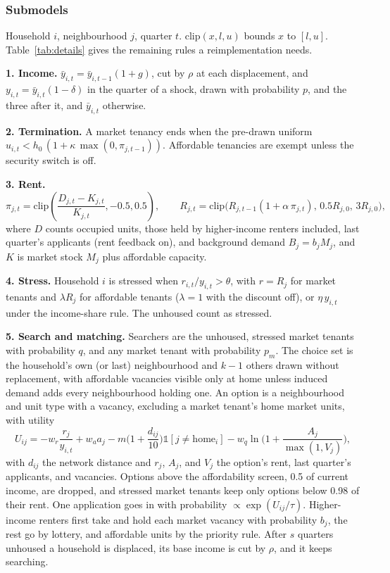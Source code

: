 \documentclass[10pt,a4paper]{article}
\begin{document}
\subsubsection*{Submodels}

Household $i$, neighbourhood $j$, quarter $t$. $\mathrm{clip}(x,l,u)$ bounds $x$ to $[l,u]$. Table~\ref{tab:details} gives the remaining rules a reimplementation needs.

\textbf{1. Income.} $\bar y_{i,t}=\bar y_{i,t-1}(1+g)$, cut by $\rho$ at each displacement, and $y_{i,t}=\bar y_{i,t}(1-\delta)$ in the quarter of a shock, drawn with probability $p$, and the three after it, and $\bar y_{i,t}$ otherwise.

\textbf{2. Termination.} A market tenancy ends when the pre-drawn uniform $u_{i,t}<h_0\,(1+\kappa\,\max(0,\pi_{j,t-1}))$. Affordable tenancies are exempt unless the security switch is off.

\textbf{3. Rent.}
\begin{equation}
\pi_{j,t}=\mathrm{clip}\!\left(\frac{D_{j,t}-K_{j,t}}{K_{j,t}},-0.5,0.5\right),\qquad
R_{j,t}=\mathrm{clip}\!\big(R_{j,t-1}(1+\alpha\,\pi_{j,t}),\,0.5R_{j,0},\,3R_{j,0}\big),
\end{equation}
where $D$ counts occupied units, those held by higher-income renters included, last quarter's applicants (rent feedback on), and background demand $B_j=b_jM_j$, and $K$ is market stock $M_j$ plus affordable capacity.

\textbf{4. Stress.} Household $i$ is stressed when $r_{i,t}/y_{i,t}>\theta$, with $r=R_j$ for market tenants and $\lambda R_j$ for affordable tenants ($\lambda=1$ with the discount off), or $\eta\,y_{i,t}$ under the income-share rule. The unhoused count as stressed.

\textbf{5. Search and matching.} Searchers are the unhoused, stressed market tenants with probability $q$, and any market tenant with probability $p_m$. The choice set is the household's own (or last) neighbourhood and $k-1$ others drawn without replacement, with affordable vacancies visible only at home unless induced demand adds every neighbourhood holding one. An option is a neighbourhood and unit type with a vacancy, excluding a market tenant's home market units, with utility
\begin{equation}
U_{ij}=-w_r\frac{r_j}{y_{i,t}}+w_a a_j-m\Big(1+\frac{d_{ij}}{10}\Big)\mathbb{1}[j\neq \mathrm{home}_i]-w_q\ln\!\Big(1+\frac{A_j}{\max(1,V_j)}\Big),
\end{equation}
with $d_{ij}$ the network distance and $r_j$, $A_j$, and $V_j$ the option's rent, last quarter's applicants, and vacancies. Options above the affordability screen, 0.5 of current income, are dropped, and stressed market tenants keep only options below 0.98 of their rent. One application goes in with probability $\propto\exp(U_{ij}/\tau)$. Higher-income renters first take and hold each market vacancy with probability $b_j$, the rest go by lottery, and affordable units by the priority rule. After $s$ quarters unhoused a household is displaced, its base income is cut by $\rho$, and it keeps searching.
\end{document}
